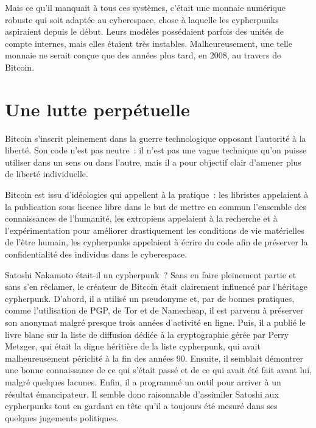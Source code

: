 Mais ce qu'il manquait à tous ces systèmes, c'était une monnaie numérique robuste qui soit adaptée au cyberespace, chose à laquelle les cypherpunks aspiraient depuis le début. Leurs modèles possédaient parfois des unités de compte internes, mais elles étaient très instables. Malheureusement, une telle monnaie ne serait conçue que des années plus tard, en 2008, au travers de Bitcoin.


\section*{Une lutte perpétuelle}

Bitcoin s'inscrit pleinement dans la guerre technologique opposant l'autorité à la liberté. Son code n'est pas neutre~: il n'est pas une vague technique qu'on puisse utiliser dans un sens ou dans l'autre, mais il a pour objectif clair d'amener plus de liberté individuelle.

Bitcoin est issu d'idéologies qui appellent à la pratique~: les libristes appelaient à la publication sous licence libre dans le but de mettre en commun l'ensemble des connaissances de l'humanité, les extropiens appelaient à la recherche et à l'expérimentation pour améliorer drastiquement les conditions de vie matérielles de l'être humain, les cypherpunks appelaient à écrire du code afin de préserver la confidentialité des individus dans le cyberespace.

Satoshi Nakamoto était-il un cypherpunk~? Sans en faire pleinement partie et sans s'en réclamer, le créateur de Bitcoin était clairement influencé par l'héritage cypherpunk. D'abord, il a utilisé un pseudonyme et, par de bonnes pratiques, comme l'utilisation de PGP, de Tor et de Namecheap, il est parvenu à préserver son anonymat malgré presque trois années d'activité en ligne. Puis, il a publié le livre blanc sur la liste de diffusion dédiée à la cryptographie gérée par Perry Metzger, qui était la digne héritière de la liste cypherpunk, qui avait malheureusement périclité à la fin des années 90. Ensuite, il semblait démontrer une bonne connaissance de ce qui s'était passé et de ce qui avait été fait avant lui, malgré quelques lacunes. Enfin, il a programmé un outil pour arriver à un résultat émancipateur. Il semble donc raisonnable d'assimiler Satoshi aux cypherpunks tout en gardant en tête qu'il a toujours été mesuré dans ses quelques jugements politiques.


\printendnotes